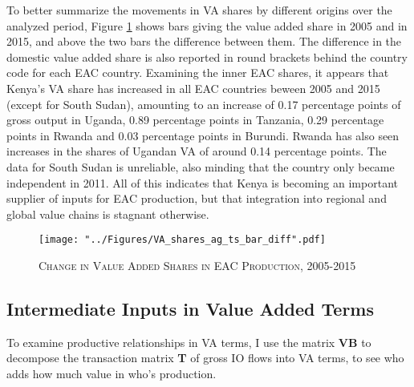 \documentclass[a4paper]{article}
\begin{document}
To better summarize the movements in VA shares by different origins over the analyzed period, Figure \ref{fig:EACVB_ts_bar} shows  bars giving the value added share in 2005 and in 2015, and above the two bars the difference between them. 
The difference in the domestic value added share is also reported in round brackets behind the country code for each EAC country. %
Examining the inner EAC shares, it appears that %
Kenya's VA share has increased in all EAC countries beween 2005 and 2015 (except for South Sudan), amounting to an increase of 0.17 percentage points of gross output in Uganda, 0.89 percentage points in Tanzania, 0.29 percentage points in Rwanda and 0.03 percentage points in Burundi. 
 Rwanda has also seen increases in the shares of Ugandan VA of around 0.14 percentage points. %
 The data for South Sudan is unreliable, also minding that the country only became independent in 2011. All of this indicates that Kenya is becoming an important supplier of inputs for EAC production, but that integration into regional and global value chains is stagnant otherwise. 

\begin{figure}[h!]
\centering
\caption{\label{fig:EACVB_ts_bar}\textsc{Change in Value Added Shares in EAC Production, 2005-2015}}
\texttt{[image: "../Figures/VA\_shares\_ag\_ts\_bar\_diff".pdf]} %
\end{figure}
\FloatBarrier



\subsection{Intermediate Inputs in Value Added Terms}

To examine productive relationships in VA terms, I use the matrix \textbf{VB} to decompose the transaction matrix \textbf{T} of gross IO flows into VA terms, to see who adds how much value in who's production.  
\end{document}
